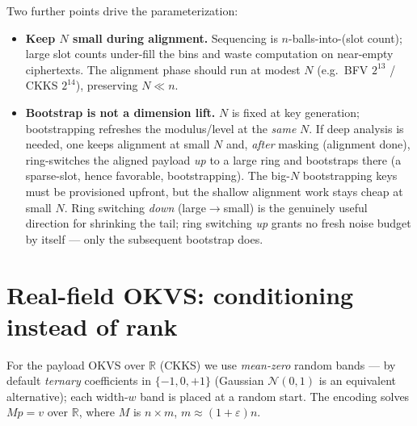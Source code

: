 \documentclass[11pt]{article}
\theoremstyle{plain}
\theoremstyle{definition}
\begin{document}
Two further points drive the parameterization:
\begin{itemize}[leftmargin=*]
  \item \textbf{Keep $N$ small during alignment.} Sequencing is $n$-balls-into-(slot count);
  large slot counts under-fill the bins and waste computation on near-empty ciphertexts. The
  alignment phase should run at modest $N$ (e.g.\ BFV $2^{13}$ / CKKS $2^{14}$), preserving
  $N\ll n$.
  \item \textbf{Bootstrap is not a dimension lift.} $N$ is fixed at key generation;
  bootstrapping refreshes the modulus/level at the \emph{same} $N$. If deep analysis is
  needed, one keeps alignment at small $N$ and, \emph{after} masking (alignment done),
  ring-switches the aligned payload \emph{up} to a large ring and bootstraps there
  (a sparse-slot, hence favorable, bootstrapping). The big-$N$ bootstrapping keys must be
  provisioned upfront, but the shallow alignment work stays cheap at small $N$. Ring
  switching \emph{down} (large$\to$small) is the genuinely useful direction for shrinking
  the tail; ring switching \emph{up} grants no fresh noise budget by itself --- only the
  subsequent bootstrap does.
\end{itemize}

\section{Real-field OKVS: conditioning instead of rank}\label{sec:real}

For the payload OKVS over $\mathbb{R}$ (CKKS) we use \emph{mean-zero} random bands --- by
default \emph{ternary} coefficients in $\{-1,0,+1\}$ (Gaussian $\mathcal N(0,1)$ is an
equivalent alternative); each width-$w$ band is placed at a random start. The encoding solves
$M p=v$ over $\mathbb{R}$, where $M$ is $n\times m$, $m\approx(1+\varepsilon)n$.
\end{document}
